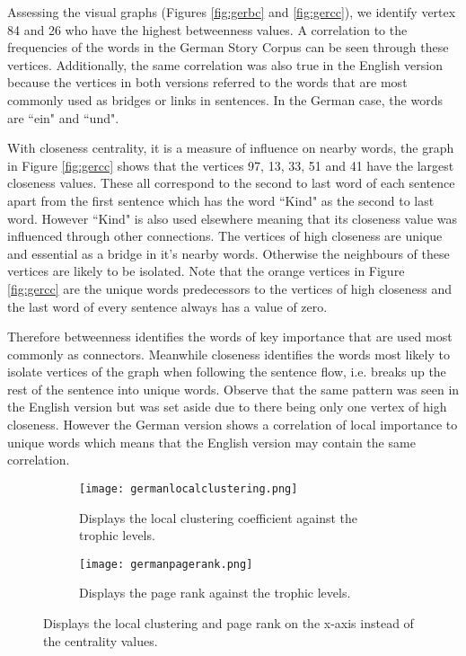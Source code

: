 Assessing the visual graphs (Figures \ref{fig:gerbc} and \ref{fig:gercc}), we identify vertex 84 and 26 who have the highest betweenness  values. A correlation to the frequencies of the words in the German Story Corpus can be seen through these vertices. Additionally, the same correlation was also true in the English version because the vertices in both versions referred to the words that are most commonly used as bridges or links in sentences. In the German case, the words are ``ein" and ``und".

With closeness centrality, it is a measure of influence on nearby words, the graph in Figure \ref{fig:gercc} shows that the vertices 97, 13, 33, 51 and 41 have the largest closeness values. These all correspond to the second to last word of each sentence apart from the first sentence which has the word ``Kind" as the second to last word. However ``Kind" is also used elsewhere meaning that its closeness value was influenced through other connections. The vertices of high closeness are unique and essential as a bridge in it's nearby words. Otherwise the neighbours of these vertices are likely to be isolated. Note that the orange vertices in Figure \ref{fig:gercc} are the unique words predecessors to the vertices of high closeness and the last word of every sentence always has a value of zero.

Therefore betweenness identifies the words of key importance that are used most commonly as connectors. Meanwhile closeness identifies the words most likely to isolate vertices of the graph when following the sentence flow, i.e. breaks up the rest of the sentence into unique words. Observe that the same pattern was seen in the English version but was set aside due to there being only one vertex of high closeness. However the German version shows a correlation of local importance to unique words which means that the English version may contain the same correlation.

\begin{figure}[H]
\centering
\begin{subfigure}{.45\textwidth}
	\hspace{-1cm} 
	\texttt{[image: germanlocalclustering.png]}
	\caption{Displays the local clustering coefficient against the trophic levels.}
	\label{fig:gerlc}
\end{subfigure}
\hfill
\begin{subfigure}{.45\textwidth}
	\hspace{-1cm} 
	\texttt{[image: germanpagerank.png]}
	\caption{Displays the page rank against the trophic levels.}
	\label{fig:gerpr}
\end{subfigure}
\caption{Displays the local clustering and page rank on the x-axis instead of the centrality values.}
\label{fig:gerother}
\end{figure}

